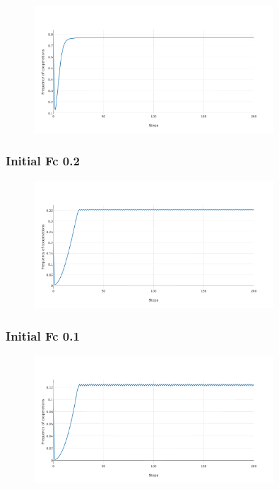 \documentclass[11pt]{article}
\begin{document}
\begin{figure}[H]
\centering
   \includegraphics[width=0.8\textwidth]{img/part3/bonus-02-D.png}
\end{figure}

\subsubsection{Initial Fc 0.2}

\begin{figure}[H]
\centering
   \includegraphics[width=0.8\textwidth]{img/part3/bonus-08-D.png}
\end{figure}

\subsubsection{Initial Fc 0.1}

\begin{figure}[H]
\centering
   \includegraphics[width=0.8\textwidth]{img/part3/bonus-09-D.png}
\end{figure}
\end{document}
